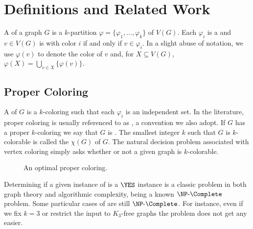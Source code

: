 \section{Definitions and Related Work}

A  of a graph $G$ is a $k$-partition $\varphi = \{\varphi_1, \dots,\varphi_k\}$ of $V(G)$.
Each $\varphi_i$ is a  and $v \in V(G)$ is  with color $i$ if and only if $v \in \varphi_i$.
In a slight abuse of notation, we use $\varphi(v)$ to denote the color of $v$ and, for $X \subseteq V(G)$, $\varphi(X) = \bigcup_{v \in X} \{\varphi(v)\}$.

\subsection{Proper Coloring}

A  of $G$ is a $k$-coloring such that each $\varphi_i$ is an independent set.
In the literature, proper coloring is usually referenced to as , a convention we also adopt.
If $G$ has a proper $k$-coloring we say that $G$ is .
The smallest integer $k$ such that $G$ is $k$-colorable is called the  $\chi(G)$ of $G$.
The natural decision problem associated with vertex coloring simply asks whether or not a given graph is $k$-colorable.



\begin{figure}[!htb]
    \centering
    \caption{An optimal proper coloring.}
    \label{fig:prop_color}
\end{figure}

Determining if a given instance of  is a $\YES$ instance is a classic problem in both graph theory and algorithmic complexity, being a known $\NPc$ problem.
Some particular cases of  are still $\NPc$.
For instance, even if we fix $k=3$ or restrict the input to $K_3$-free graphs the problem does not get any easier.

